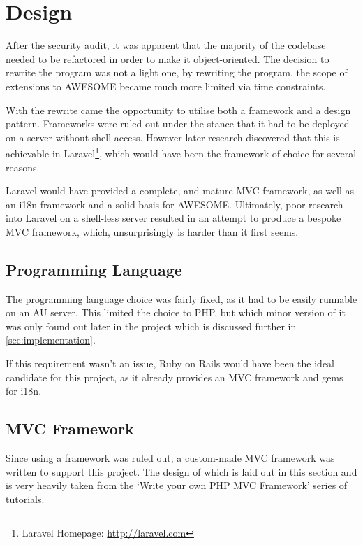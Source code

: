 \chapter{Design}
	
	After the security audit, it was apparent that the majority of the codebase needed to be refactored in order to make it object-oriented.
	The decision to rewrite the program was not a light one, by rewriting the program, the scope of extensions to \ac{AWESOME} became much more limited via time constraints.
	
	With the rewrite came the opportunity to utilise both a framework and a design pattern.
	Frameworks were ruled out under the stance that it had to be deployed on a server without shell access.
	However later research discovered that this is achievable in Laravel\footnote{Laravel Homepage: \url{http://laravel.com}}, which would have been the framework of choice for several reasons.
	
	Laravel would have provided a complete, and mature \ac{MVC} framework, as well as an \ac{i18n} framework and a solid basis for \ac{AWESOME}.
	Ultimately, poor research into Laravel on a shell-less server resulted in an attempt to produce a bespoke \ac{MVC} framework, which, unsurprisingly is harder than it first seems.
	
	\section{Programming Language}
	
	The programming language choice was fairly fixed, as it had to be easily runnable on an \ac{AU} server.
	This limited the choice to PHP, but which minor version of it was only found out later in the project which is discussed further in \autoref{sec:implementation}.
	
	If this requirement wasn't an issue, Ruby on Rails would have been the ideal candidate for this project, as it already provides an \ac{MVC} framework and gems for \ac{i18n}.
	
	\section{\acl{MVC} Framework}
	
	Since using a framework was ruled out, a custom-made \ac{MVC} framework was written to support this project.
	The design of which is laid out in this section and is very heavily taken from the `Write your own PHP MVC Framework' series of tutorials\cite{php-mvc-tutorial}.
	
